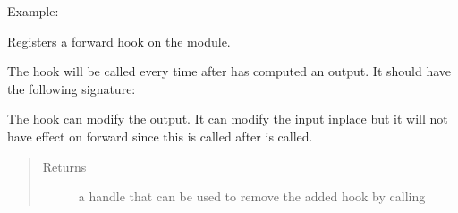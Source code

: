 \documentclass[letterpaper,10pt,english]{sphinxmanual}
\begin{document}
\begin{fulllineitems}
\begin{fulllineitems}
\begin{quote}
\begin{description}
\begin{itemize}
\end{itemize}

\end{description}\end{quote}

Example:

\begin{sphinxVerbatim}[commandchars=\\\{\}]
 
\end{sphinxVerbatim}

\end{fulllineitems}


\begin{fulllineitems}
\label{\detokenize{api/dynamics:geology.metamodelling.dynamics.LatentSpaceDynamics.register_forward_hook}}
Registers a forward hook on the module.

The hook will be called every time after {\hyperref[\detokenize{api/dynamics:geology.metamodelling.dynamics.LatentSpaceDynamics.forward}]{}} has computed an output.
It should have the following signature:

\begin{sphinxVerbatim}[commandchars=\\\{\}]
       
\end{sphinxVerbatim}

The hook can modify the output. It can modify the input inplace but
it will not have effect on forward since this is called after
{\hyperref[\detokenize{api/dynamics:geology.metamodelling.dynamics.LatentSpaceDynamics.forward}]{}} is called.
\begin{quote}\begin{description}
\item[{Returns}] \leavevmode
a handle that can be used to remove the added hook by calling


\end{description}
\end{quote}
\end{fulllineitems}
\end{fulllineitems}
\end{document}
